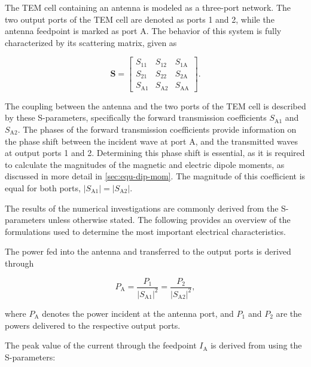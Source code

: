 The TEM cell containing an antenna is modeled as a three-port network. The two output ports of the TEM cell are denoted as ports 1 and 2, while the antenna feedpoint is marked as port A. The behavior of this system is fully characterized by its scattering matrix, given as \cite[p.~23]{Steer_2015}

\begin{equation}
	\mathbf{S}=
	\begin{bmatrix}
		S_{11} & S_{12} & S_{1\mathrm{A}} \\
		S_{21} & S_{22} & S_{2\mathrm{A}} \\
		S_{\mathrm{A}1} & S_{\mathrm{A}2} & S_{\mathrm{AA}}
	\end{bmatrix}.
\end{equation}

The coupling between the antenna and the two ports of the TEM cell is described by these S-parameters, specifically the forward transmission coefficients $S_{\mathrm{A1}}$ and $S_{\mathrm{A2}}$. The phases of the forward transmission coefficients provide information on the phase shift between the incident wave at port A, and the transmitted waves at output ports 1 and 2. Determining this phase shift is essential, as it is required to calculate the magnitudes of the magnetic and electric dipole moments, as discussed in more detail in \cref{sec:equ-dip-mom}. The magnitude of this coefficient is equal for both ports, $|S_{\mathrm{A1}}|=|S_{\mathrm{A2}}|$. 

The results of the numerical investigations are commonly derived from the S-parameters unless otherwise stated. The following provides an overview of the formulations used to determine the most important electrical characteristics.

The power fed into the antenna and transferred to the output ports is derived through \cite[p.~17]{Steer_2015}

\begin{equation}
	P_{\mathrm{A}}=\frac{P_{\mathrm{1}}}{|S_{\mathrm{A1}}|^2}=\frac{P_{\mathrm{2}}}{|S_{\mathrm{A2}}|^2},
	\label{eqn:power_antenna}
\end{equation}

where $P_{\mathrm{A}}$ denotes the power incident at the antenna port, and $P_{\mathrm{1}}$ and $P_{\mathrm{2}}$ are the powers delivered to the respective output ports.
  
The peak value of the current through the feedpoint $I_\mathrm{A}$ is derived from \cite[p.~24]{Steer_2015} using the S-parameters:
  
